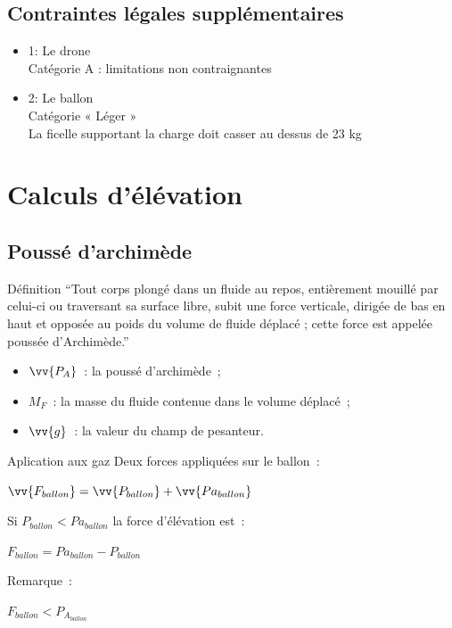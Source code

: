 \documentclass{beamer}
\begin{document}
\subsection{Contraintes légales supplémentaires}
\begin{frame}
  \begin{itemize}
    \item 1: Le drone \\
	    Catégorie A : limitations non contraignantes
    \item 2: Le ballon \\
	    Catégorie « Léger » \\
	    La ficelle supportant la charge doit casser au dessus de 23 kg
 \end{itemize}
\end{frame}

\section{Calculs d'élévation}

\subsection{Poussé d'archimède}

\begin{frame}{Définition}
  \enquote{Tout corps plongé dans un fluide au repos, entièrement mouillé par celui-ci ou traversant sa surface libre, subit une force verticale, dirigée de bas en haut et opposée au poids du volume de fluide déplacé ; cette force est appelée poussée d'Archimède.}
  \bigbreak
  \begin{center}
  \end{center}
  \begin{itemize}
    \item $\vv{P_A}$~: la poussé d'archimède~;
    \item $M_F$~: la masse du fluide contenue dans le volume déplacé~;
    \item $\vv{g}$~: la valeur du champ de pesanteur.
  \end{itemize}
\end{frame}

\begin{frame}{Aplication aux gaz}
  Deux forces appliquées sur le ballon~: \\
  \begin{center}
    $\displaystyle{\vv{F_{ballon}} = \vv{P_{ballon}} + \vv{Pa_{ballon}}}$ \\
  \end{center}
  Si $P_{ballon} < Pa_{ballon}$ la force d'élévation est~:
  \begin{center}
    $\displaystyle{F_{ballon} = Pa_{ballon} - P_{ballon}}$ \\
  \end{center}
  Remarque~:\\
  \begin{center}
    $F_{ballon} < P_{A_{ballon}}$
  \end{center}
\end{frame}
\end{document}
